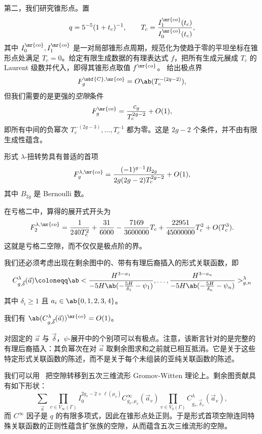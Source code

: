 第二，我们研究锥形点。置
\[ q = 5^{-5}(1+t_c)^{-1}, \qquad T_c = \frac{I_1^{\mr{co}}(t_c)}{I_0^{\mr{co}}(t_c)}, \]
其中 \(I_0^{\mr{co}}, I_1^{\mr{co}}\) 是一对局部锥形点周期，规范化为使趋于零的平坦坐标在锥形点处满足 \(T_c = 0\)。给定有限生成数据的有理表达式 \(f\)，把所有生成元展成 \(T_c\) 的 Laurent 级数并代入，即得其锥形点取值 \(f^{\mr{co}}\)。 给出极点界
\[ F_g^{\mbf{C},\mr{co}} = O\ab(T_c^{-(2g-2)}), \]
但我们需要的是更强的\textit{空隙}条件
\[ F_g^{\mr{co}} = \frac{c_g}{T_c^{2g-2}} + O(1), \]
即所有中间的负幂次 \(T_c^{-(2g-3)}, \ldots, T_c^{-1}\) 都为零。这是 \(2g-2\) 个条件，并不由有限生成性蕴含。

\begin{conj}[形式锥形点空隙]%
\label{conj:formal conifold gap}
    形式 \(\lambda\)-扭转势具有普适的首项
    \[ F_g^{\lambda,\mr{co}} = \frac{(-1)^{g-1}B_{2g}}{2g(2g-2)T_c^{2g-2}} + O(1), \]
    其中 \(B_{2g}\) 是 Bernoulli 数。
\end{conj}

\begin{exm}
    在亏格二中，算得的展开式开头为
    \[ F_2^{\lambda,\mr{co}} = \frac{1}{240T_c^2} + \frac{31}{6000} - \frac{7169}{3600000}T_c + \frac{22951}{45000000}T_c^2 + O(T_c^3). \]
    这就是亏格二空隙，而不仅仅是极点阶的界。
\end{exm}

我们还必须考虑出现在剩余图中的、带有有理后裔插入的形式关联函数，即
\[ C^{\lambda}_{g,\vec{\delta}}(\vec{a}) \coloneqq \ab< \frac{H^{3-a_1}}{-5H\ab(-\frac{5H}{\delta_1}-\psi_1)}, \ldots, \frac{H^{3-a_n}}{-5H\ab(-\frac{5H}{\delta_n}-\psi_n)}>^{\lambda}_{g,n} \]
其中 \(\delta_i \geq 1\) 且 \(a_i \in \ab\{0,1,2,3,4\}\)。

\begin{conj}[带特殊插入的正则性]%
\label{conj:special correlator regularity}
    我们有 \(\ab(C^{\lambda}_{g,\vec{\delta}}(\vec{a}))^{\mr{co}} = O(1)\)。
\end{conj}

对固定的 \(\vec{a}\) 与 \(\vec{\delta}\)，\(\psi\)-展开中的个别项可以有极点。注意，该断言针对的是完整的有理后裔插入：其负幂次在对 \(\vec{a}\) 取剩余图求和之前就已相互抵消。它是关于这些特定形式关联函数的陈述，而不是关于每个未组装的亚纯关联函数的陈述。

我们可以用~ 把空隙转移到五次三维流形 Gromov-Witten 理论上。剩余图贡献具有如下形状：
\[ \sum_{\vec{a}} \prod_{v \in V_{\infty}(\Gamma)}I_0^{2g_v-2+\ell(\mu_v)}C^{\infty}_{g_v,\mu_v}(\vec{a}_v)\prod_{v\in V_0(\Gamma)}C^{\lambda}_{g_v,\vec{\delta}_v}(\vec{a}_v), \]
而 \(C^{\infty}\) 因子是 \(q\) 的有限多项式，因此在锥形点处正则。于是形式首项空隙连同特殊关联函数的正则性蕴含扩张族的空隙，从而蕴含五次三维流形的空隙。

